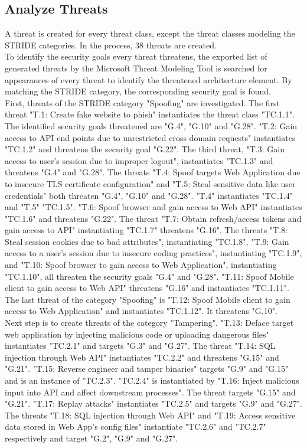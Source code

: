 \subsection{Analyze Threats}
A threat is created for every threat class, except the threat classes modeling the STRIDE categories. In the process, 38 threats are created.\\
To identify the security goals every threat threatens, the exported list of generated threats by the Microsoft Threat Modeling Tool is searched for appearances of every threat to identify the threatened architecture element. By matching the STRIDE category, the corresponding security goal is found.\\
\newline
First, threats of the STRIDE category "Spoofing" are investigated. The first threat "T.1: Create fake website to phish" instantiates the threat class "TC.1.1". The identified security goals threatened are "G.4", "G.10" and "G.28". "T.2: Gain access to API end points due to unrestricted cross domain requests" instantiates "TC.1.2" and threatens the security goal "G.22". The third threat, "T.3: Gain access to user's session due to improper logout", instantiates "TC.1.3" and threatens "G.4" and "G.28". The threats "T.4: Spoof targets Web Application due to insecure TLS certificate configuration" and "T.5: Steal sensitive data like user credentials" both threaten "G.4", "G.10" and "G.28". "T.4" instantiates "TC.1.4" and "T.5" "TC.1.5". "T.6: Spoof browser and gain access to Web API" instantiates "TC.1.6" and threatens "G.22". The threat "T.7: Obtain refresh/access tokens and gain access to API" instantiating "TC.1.7" threatens "G.16". The threats "T.8: Steal session cookies due to bad attributes", instantiating "TC.1.8", "T.9: Gain access to a user's session due to insecure coding practices", instantiating "TC.1.9", and "T.10: Spoof browser to gain access to Web Application", instantiating "TC.1.10", all threaten the security goals "G.4" and "G.28". "T.11: Spoof Mobile client to gain access to Web API" threatens "G.16" and instantiates "TC.1.11". The last threat of the category "Spoofing" is "T.12: Spoof Mobile client to gain access to Web Application" and instantiates "TC.1.12". It threatens "G.10". \\
\newline
Next step is to create threats of the category "Tampering". "T.13: Deface target web application by injecting malicious code or uploading dangerous files" instantiates "TC.2.1" and targets "G.3" and "G.27". The threat "T.14: SQL injection through Web API" instantiates "TC.2.2" and threatens "G.15" and "G.21". "T.15: Reverse engineer and tamper binaries" targets "G.9" and "G.15" and is an instance of "TC.2.3". "TC.2.4" is instantiated by "T.16: Inject malicious input into API and affect downstream processes". The threat targets "G.15" and "G.21". "T.17: Replay attacks" instantiates "TC.2.5" and targets "G.9" and "G.27". The threats "T.18: SQL injection through Web API" and "T.19: Access sensitive data stored in Web App's config files" instantiate "TC.2.6" and "TC.2.7" respectively and target "G.2", "G.9" and "G.27".\\
